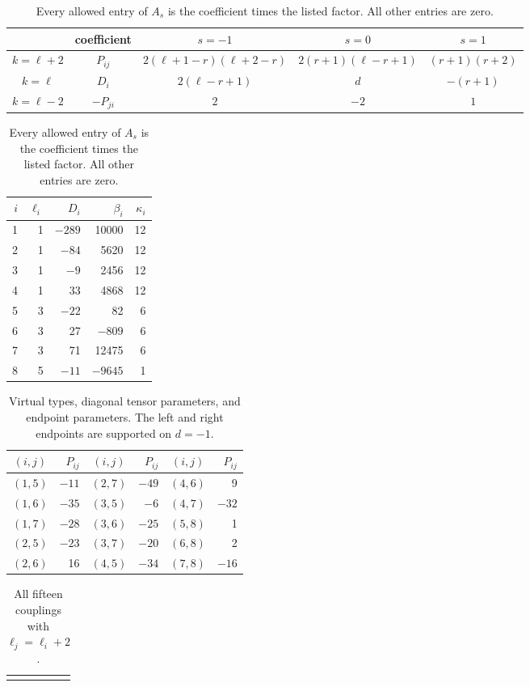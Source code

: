 \documentclass[11pt]{article}
\theoremstyle{remark}
\numberwithin{equation}{section}
\begin{document}
\begin{table}[htbp]

\setlength{\tabcolsep}{5pt}
\begin{tabular}{c|c|ccc}
 &coefficient&$s=-1$&$s=0$&$s=1$\\ \hline
 $k=\ell+2$&$P_{ij}$&
 $2(\ell+1-r)(\ell+2-r)$&$2(r+1)(\ell-r+1)$&$(r+1)(r+2)$\\
 $k=\ell$&$D_i$&$2(\ell-r+1)$&$d$&$-(r+1)$\\
 $k=\ell-2$&$-P_{ji}$&$2$&$-2$&$1$
\end{tabular}
\caption{Every allowed entry of $A_s$ is the coefficient times the
listed factor.  All other entries are zero.}
\label{apptr:entry-table}
\par\vspace{1.5em}
\begin{tabular}{r|r|r|r|r}
 $i$&$\ell_i$&$D_i$&$\beta_i$&$\kappa_i$\\ \hline
 1&1&$-289$&10000&12\\
 2&1&$-84$&5620&12\\
 3&1&$-9$&2456&12\\
 4&1&33&4868&12\\
 5&3&$-22$&82&6\\
 6&3&27&$-809$&6\\
 7&3&71&12475&6\\
 8&5&$-11$&$-9645$&1
\end{tabular}
\end{table}

\begin{table}
\caption{Virtual types, diagonal tensor parameters, and endpoint
parameters.  The left and right endpoints are supported on $d=-1$.}
\label{apptr:endpoint-table}
\par\vspace{1.5em}
\begin{tabular}{c|r@{\qquad}c|r@{\qquad}c|r}
 $(i,j)$&$P_{ij}$&$(i,j)$&$P_{ij}$&$(i,j)$&$P_{ij}$\\ \hline
 $(1,5)$&$-11$&$(2,7)$&$-49$&$(4,6)$&9\\
 $(1,6)$&$-35$&$(3,5)$&$-6$&$(4,7)$&$-32$\\
 $(1,7)$&$-28$&$(3,6)$&$-25$&$(5,8)$&1\\
 $(2,5)$&$-23$&$(3,7)$&$-20$&$(6,8)$&2\\
 $(2,6)$&16&$(4,5)$&$-34$&$(7,8)$&$-16$
\end{tabular}
\end{table}

\begin{table}
\begin{tabular}{l}\mbox{}\end{tabular}
\caption{All fifteen couplings with $\ell_j=\ell_i+2$.}
\label{apptr:coupling-table}
\end{table}
\FloatBarrier
\end{document}
